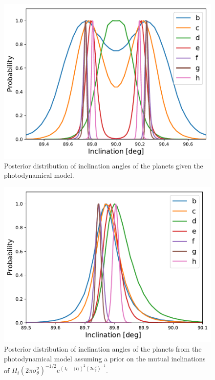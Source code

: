 \documentclass[twocolumn]{aastex63}
\begin{document}
\begin{figure}
    \centering
    \includegraphics[width=\hsize]{figures/inclination_noprior.pdf}
    \caption{Posterior distribution of inclination angles of the planets given
    the photodynamical model.}
    \label{fig:inclination_distribution}
\end{figure}

\begin{figure}
    \centering
    \includegraphics[width=\hsize]{figures/inclination_nouprior_incprior.pdf}
    \caption{Posterior distribution of inclination angles of the planets from the photodynamical model assuming
    a prior on the mutual inclinations of $\Pi_i (2\pi\sigma_\theta^2)^{-1/2} e^{(I_i-\langle I\rangle)^2(2\sigma_\theta^2)^{-1}}$.}
    \label{fig:inclination_prior}
\end{figure}
\end{document}
